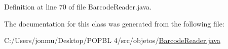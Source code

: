 Definition at line 70 of file Barcode\+Reader.\+java.



The documentation for this class was generated from the following file\+:\begin{DoxyCompactItemize}
\item 
C\+:/\+Users/jonmu/\+Desktop/\+P\+O\+P\+B\+L 4/src/objetos/\mbox{\hyperlink{_barcode_reader_8java}{Barcode\+Reader.\+java}}\end{DoxyCompactItemize}
